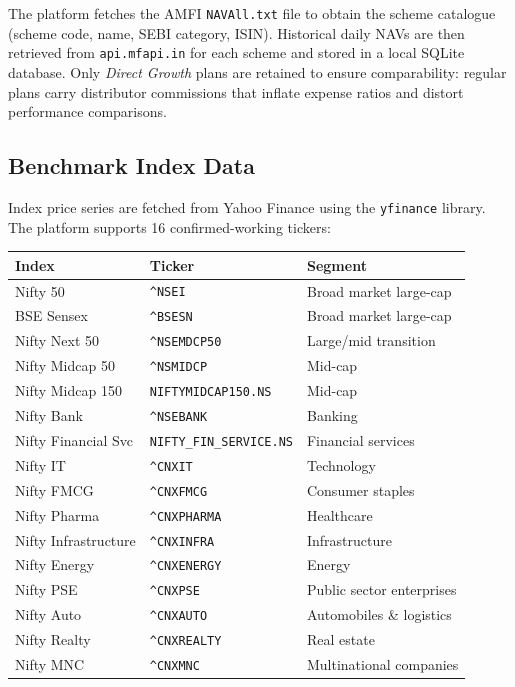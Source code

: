 \documentclass[12pt, a4paper]{article}
\begin{document}
The platform fetches the AMFI \texttt{NAVAll.txt} file to obtain the
scheme catalogue (scheme code, name, SEBI category, ISIN).  Historical
daily NAVs are then retrieved from \texttt{api.mfapi.in} for each scheme
and stored in a local SQLite database.  Only \emph{Direct Growth} plans
are retained to ensure comparability: regular plans carry distributor
commissions that inflate expense ratios and distort performance
comparisons.

\subsection{Benchmark Index Data}

Index price series are fetched from Yahoo Finance using the
\texttt{yfinance} library.  The platform supports 16 confirmed-working
tickers:

\begin{center}
\begin{tabular}{@{}lll@{}}
\toprule
Index & Ticker & Segment \\
\midrule
Nifty 50 & \texttt{\^{}NSEI} & Broad market large-cap \\
BSE Sensex & \texttt{\^{}BSESN} & Broad market large-cap \\
Nifty Next 50 & \texttt{\^{}NSEMDCP50} & Large/mid transition \\
Nifty Midcap 50 & \texttt{\^{}NSMIDCP} & Mid-cap \\
Nifty Midcap 150 & \texttt{NIFTYMIDCAP150.NS} & Mid-cap \\
Nifty Bank & \texttt{\^{}NSEBANK} & Banking \\
Nifty Financial Svc & \texttt{NIFTY\_FIN\_SERVICE.NS} & Financial services \\
Nifty IT & \texttt{\^{}CNXIT} & Technology \\
Nifty FMCG & \texttt{\^{}CNXFMCG} & Consumer staples \\
Nifty Pharma & \texttt{\^{}CNXPHARMA} & Healthcare \\
Nifty Infrastructure & \texttt{\^{}CNXINFRA} & Infrastructure \\
Nifty Energy & \texttt{\^{}CNXENERGY} & Energy \\
Nifty PSE & \texttt{\^{}CNXPSE} & Public sector enterprises \\
Nifty Auto & \texttt{\^{}CNXAUTO} & Automobiles \& logistics \\
Nifty Realty & \texttt{\^{}CNXREALTY} & Real estate \\
Nifty MNC & \texttt{\^{}CNXMNC} & Multinational companies \\
\bottomrule
\end{tabular}
\end{center}
\end{document}
